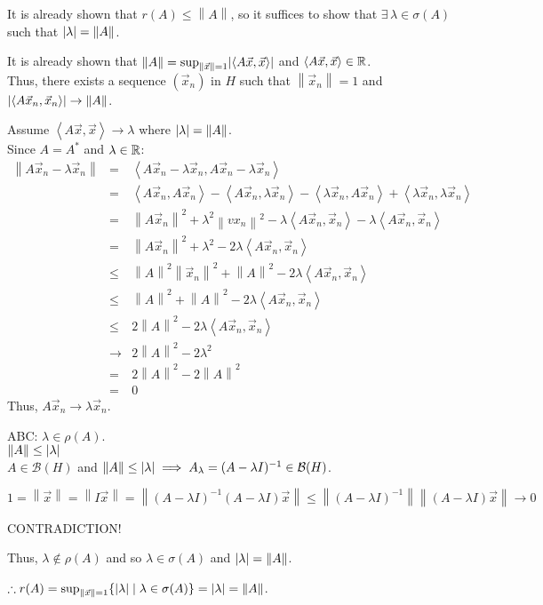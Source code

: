 \documentclass[letterpaper,12pt,fleqn]{article}
\renewcommand{\l}{\lambda}
\renewcommand{\o}{\sigma}
\newcommand{\p}{\rho}
\newcommand{\vx}{\vec{x}}
\newcommand{\norm}[1]{\left\|#1\right\|}
\newcommand{\inner}[1]{\left<#1\right>}
\newcommand{\mb}{\mathcal{B}}
\begin{document}
\begin{theproof}
  It is already shown that $r(A)\le\norm{A}$, so it suffices to show that
  $\exists\,\l\in\o(A)$ such that $\abs{\l}=\norm{A}$.

  It is already shown that $\norm{A}=\sup_{\norm{\vx}=1}\abs{\inner{A\vx,\vx}}$
  and $\inner{A\vx,\vx}\in\R$. \\
  Thus, there exists a sequence $(\vx_n)$ in $H$ such that $\norm{\vx_n}=1$
  and $\abs{\inner{A\vx_n,\vx_n}}\to\norm{A}$.

  Assume $\inner{A\vx,\vx}\to\l$ where $\abs{\l}=\norm{A}$. \\
  Since $A=A^*$ and $\l\in\R$:
  \begin{eqnarray*}
    \norm{A\vx_n-\l\vx_n} &=& \inner{A\vx_n-\l\vx_n,A\vx_n-\l\vx_n} \\
    &=& \inner{A\vx_n,A\vx_n}-\inner{A\vx_n,\l\vx_n}-\inner{\l\vx_n,A\vx_n}
    +\inner{\l\vx_n,\l\vx_n} \\
    &=& \norm{A\vx_n}^2+\l^2\norm{vx_n}^2-\l\inner{A\vx_n,\vx_n}-
    \l\inner{A\vx_n,\vx_n} \\
    &=& \norm{A\vx_n}^2+\l^2-2\l\inner{A\vx_n,\vx_n} \\
    &\le& \norm{A}^2\norm{\vx_n}^2+\norm{A}^2-2\l\inner{A\vx_n,\vx_n} \\
    &\le& \norm{A}^2+\norm{A}^2-2\l\inner{A\vx_n,\vx_n} \\
    &\le& 2\norm{A}^2-2\l\inner{A\vx_n,\vx_n} \\
    &\to& 2\norm{A}^2-2\l^2 \\
    &=& 2\norm{A}^2-2\norm{A}^2 \\
    &=& 0
  \end{eqnarray*}
  Thus, $A\vx_n\to\l\vx_n$.

  ABC: $\l\in\p(A)$. \\  
  $\norm{A}\le\abs{\l}$ \\
  $A\in\mb(H)$ and $\norm{A}\le\abs{\l}\implies A_{\l}=(A-\l I)^{-1}\in\mb(H)$.

  $1=\norm{\vx}=\norm{I\vx}=\norm{(A-\l I)^{-1}(A-\l I)\vx}\le
  \norm{(A-\l I)^{-1}}\norm{(A-\l I)\vx}\to0$

  CONTRADICTION!

  Thus, $\l\notin\p(A)$ and so $\l\in\o(A)$ and $\abs{\l}=\norm{A}$.

  $\therefore r(A)=\sup_{\norm{\vx}=1}\{\abs{\l}\mid\l\in\o(A)\}=\abs{\l}=
  \norm{A}$.
\end{theproof}
\end{document}
